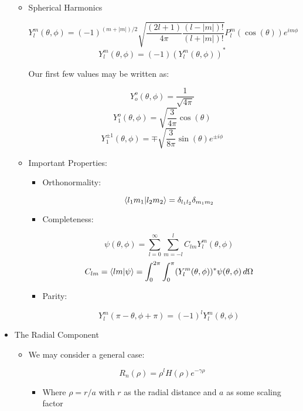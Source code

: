 \begin{itemize}
\begin{itemize}
      \item Spherical Harmonics

        $$Y_l^m(\theta,\phi)=(-1)^{(m+|m|)/2}\sqrt{\frac{(2l+1)}{4\pi}\frac{(l-|m|)!}{(l+|m|)!}}P_l^m(\cos(\theta))e^{im\phi}$$
        $$Y_l^m(\theta,\phi)=(-1)(Y_l^m(\theta,\phi))^*$$

        Our first few values may be written as:

        $$Y_o^o(\theta,\phi)=\frac{1}{\sqrt{4\pi}}$$
        $$Y_1^o(\theta,\phi)=\sqrt{\frac{3}{4\pi}}\cos(\theta)$$
        $$Y_1^{\pm1}(\theta,\phi)=\mp\sqrt{\frac{3}{8\pi}}\sin(\theta)e^{\pm i\phi}$$

      \item Important Properties:

        \begin{itemize}

          \item Orthonormality:

            $$\bra{l_1m_1}\ket{l_2m_2}=\delta_{l_1l_2}\delta_{m_1m_2}$$

          \item Completeness:

            $$\psi(\theta,\phi)=\sum_{l=0}^{\infty}\sum_{m=-l}^l C_{lm}Y_l^m(\theta,\phi)$$
            $$C_{lm}=\bra{lm}\ket{\psi}=\int_0^{2\pi}\int_0^{\pi}(Y_l^m(\theta,\phi))^*\psi(\theta,\phi)\,d\Omega$$

          \item Parity:

            $$Y_l^m(\pi-\theta,\phi+\pi)=(-1)^lY_l^m(\theta,\phi)$$

        \end{itemize}

    \end{itemize}

  \item The Radial Component

    \begin{itemize}

      \item We may consider a general case:

        $$R_n(\rho)=\rho^lH(\rho)e^{-\gamma\rho}$$

        \begin{itemize}

          \item Where $\rho=r/a$ with $r$ as the radial distance and $a$ as some scaling factor


\end{itemize}
\end{itemize}
\end{itemize}
